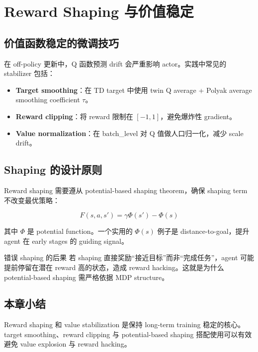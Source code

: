 \section{Reward Shaping 与价值稳定}

\subsection{价值函数稳定的微调技巧}

在 off-policy 更新中，Q 函数预测 drift 会严重影响 actor。实践中常见的 stabilizer 包括：

\begin{itemize}
    \item \textbf{Target smoothing}：在 TD target 中使用 twin Q average + Polyak average smoothing coefficient $\tau$。
    \item \textbf{Reward clipping}：将 reward 限制在 $[-1,1]$，避免爆炸性 gradient。
    \item \textbf{Value normalization}：在 batch_level 对 Q 值做人口归一化，减少 scale drift。
\end{itemize}

\subsection{Shaping 的设计原则}

Reward shaping 需要遵从 potential-based shaping theorem，确保 shaping term 不改变最优策略：

$$F(s, a, s') = \gamma \Phi(s') - \Phi(s)$$

其中 $\Phi$ 是 potential function。一个实用的 $\Phi(s)$ 例子是 distance-to-goal，提升 agent 在 early stages 的 guiding signal。

\begin{warningbox}{错误 shaping 的后果}
若 shaping 直接奖励“接近目标”而非“完成任务”，agent 可能提前停留在潜在 reward 高的状态，造成 reward hacking。这就是为什么 potential-based shaping 需严格依据 MDP structure。
\end{warningbox}

\subsection{本章小结}

Reward shaping 和 value stabilization 是保持 long-term training 稳定的核心。target smoothing、reward clipping 与 potential-based shaping 搭配使用可以有效避免 value explosion 与 reward hacking。


